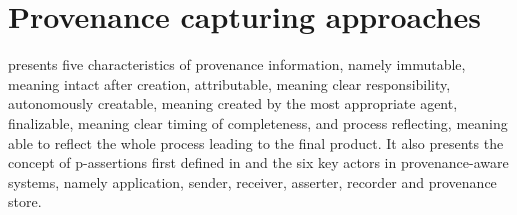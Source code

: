 

\section{Provenance capturing approaches}
\cite{groth2009recording} presents five characteristics of provenance information, namely immutable, meaning intact after creation, attributable, meaning clear responsibility, autonomously creatable, meaning created by the most appropriate agent, finalizable, meaning clear timing of completeness, and process reflecting, meaning able to reflect the whole process leading to the final product. It also presents the concept of p-assertions first defined in \cite{groth2006architecture} and the six key actors in provenance-aware systems, namely application, sender, receiver, asserter, recorder and provenance store.

